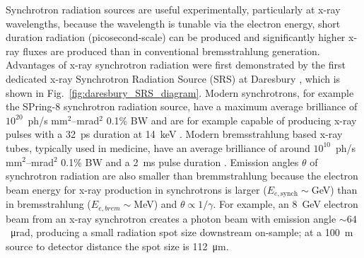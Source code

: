 \documentclass[../main.tex]{subfiles}
\begin{document}
Synchrotron radiation sources are useful experimentally, particularly at x-ray wavelengths, because the wavelength is tunable via the electron energy, short duration radiation (picosecond-scale) can be produced and significantly higher x-ray fluxes are produced than in conventional bremsstrahlung generation. Advantages of x-ray synchrotron radiation were first demonstrated by the first dedicated x-ray Synchrotron Radiation Source (SRS) at Daresbury \cite{munro2019fifty,robinson1981experiments}, which is shown in Fig.~\ref{fig:daresbury_SRS_diagram}. Modern synchrotrons, for example the SPring-8 synchrotron radiation source, have a maximum average brilliance of $10^{20}$~ph/\si{\second} \si{\milli\meter}$^{2}$--\si{\milli\radian}$^{2}$ 0.1\% BW \cite{spring8beamlines} and are for example capable of producing x-ray pulses with a 32~\si{\pico\second} duration at 14~\si{\kilo\electronvolt} \cite{tanaka2001field}. Modern bremsstrahlung based x-ray tubes, typically used in medicine, have an average brilliance of around $10^{10}$~ph/\si{\second} \si{\milli\meter}$^{2}$--\si{\milli\radian}$^{2}$ 0.1\% BW and a 2~\si{\milli\second} pulse duration \cite{behling2018diagnostic}.
Emission angles $\theta$ of synchrotron radiation are also smaller than bremmstrahlung because the electron beam energy for x-ray production in synchrotrons is larger ($E_{e,\mathrm{synch}}\sim$\si{\giga\electronvolt}) than in bremsstrahlung ($E_{e,\si{brem}}\sim$\si{\mega\electronvolt}) and $\theta \propto 1/\gamma$. For example, an 8~\si{\giga\electronvolt} electron beam from an x-ray synchrotron creates a photon beam with emission angle $\sim 64$~\si{\micro\radian}, producing a small radiation spot size downstream on-sample; at a 100~\si{\meter} source to detector distance the spot size is 112~\si{\micro\meter}.        
\end{document}
